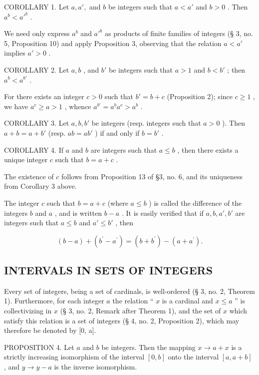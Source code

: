 COROLLARY 1. Let \(a, a',\) and \(b\) be integers such that \(a < a'\) and \(b > 0\) . Then \(a^b < a'^b\) .

We need only express \(a^b\) and \(a'^b\) as products of finite families of integers (§ 3, no. 5, Proposition 10) and apply Proposition 3, observing that the relation \(a < a'\) implies \(a' > 0\) .

COROLLARY 2. Let \(a, b\) , and \(b'\) be integers such that \(a > 1\) and \(b < b'\) ; then \(a^b < a^{b'}\) .

For there exists an integer \(c > 0\) such that \(b' = b + c\) (Proposition 2); since \(c \geqslant 1\) , we have \(a^c \geqslant a > 1\) , whence \(a^{b'} = a^b a^c > a^b\) .

COROLLARY 3. Let \(a, b, b'\) be integers (resp. integers such that \(a > 0\) ). Then \(a + b = a + b'\) (resp. \(ab = ab'\) ) if and only if \(b = b'\) .

COROLLARY 4. If \(a\) and \(b\) are integers such that \(a \leqslant b\) , then there exists a unique integer \(c\) such that \(b = a + c\) .

The existence of \(c\) follows from Proposition 13 of §3, no. 6, and its uniqueness from Corollary 3 above.

The integer \(c\) such that \(b = a + c\) (where \(a \leqslant b\) ) is called the difference of the integers \(b\) and \(a\) , and is written \(b - a\) . It is easily verified that if \(a, b, a', b'\) are integers such that \(a \leqslant b\) and \(a' \leqslant b'\) , then

\[
(b - a) + (b ^ {\prime} - a ^ {\prime}) = (b + b ^ {\prime}) - (a + a ^ {\prime}).
\]

\subsection{INTERVALS IN SETS OF INTEGERS}

Every set of integers, being a set of cardinals, is well-ordered (§ 3, no. 2, Theorem 1). Furthermore, for each integer \(a\) the relation `` \(x\) is a cardinal and \(x \leqslant a\) '' is collectivizing in \(x\) (§ 3, no. 2, Remark after Theorem 1), and the set of \(x\) which satisfy this relation is a set of integers (§ 4, no. 2, Proposition 2), which may therefore be denoted by {[}0, a{]}.

PROPOSITION 4. Let \(a\) and \(b\) be integers. Then the mapping \(x \to a + x\) is a strictly increasing isomorphism of the interval \([0, b]\) onto the interval \([a, a + b]\) , and \(y \to y - a\) is the inverse isomorphism.

